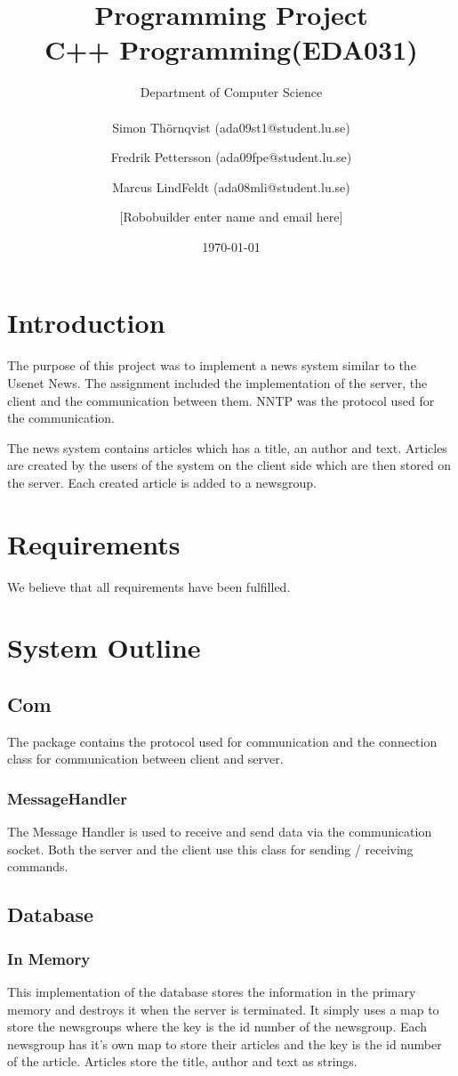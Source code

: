 \documentclass[a4paper, titlepage]{article}
\title{
    Programming Project \\
    C++ Programming(EDA031)
}
\author{
        Department of Computer Science \\
            \\
        Simon Thörnqvist (ada09st1@student.lu.se)
            \and
        Fredrik Pettersson (ada09fpe@student.lu.se)
            \and
        Marcus LindFeldt (ada08mli@student.lu.se)
            \and
        [Robobuilder enter name and email here]
}
\date{\today}
\begin{document}
\maketitle

\section{Introduction}\label{introduction}
The purpose of this project was to implement a news system similar to the Usenet News. The assignment included the implementation of the server, the client and the communication between them. NNTP was the protocol used for the communication.

The news system contains articles which has a title, an author and text. Articles are created by the users of the system on the client side which are then stored on the server. Each created article is added to a newsgroup.

\section{Requirements}\label{requirements}
We believe that all requirements have been fulfilled.

\section{System Outline}\label{systemoutline}

\subsection{Com}
The package contains the protocol used for communication and the connection class for communication between client and server.

\subsubsection{MessageHandler}
The Message Handler is used to receive and send data via the communication socket. Both the server and the client use this class for sending / receiving commands.

\subsection{Database}

\subsubsection{In Memory}
This implementation of the database stores the information in the primary memory and destroys it when the server is terminated. It simply uses a map to store the newsgroups where the key is the id number of the newsgroup. Each newsgroup has it's own map to store their articles and the key is the id number of the article. Articles store the title, author and text as strings.
\end{document}

